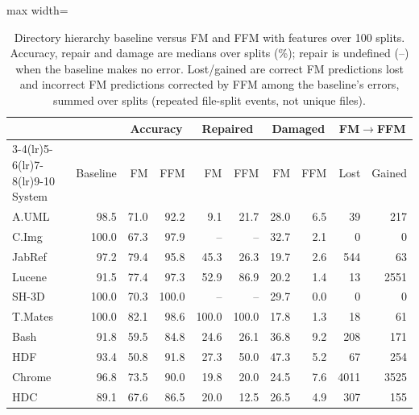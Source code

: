 \begin{table}[t]
\centering
\small
\caption{Directory hierarchy baseline versus FM and FFM with \ft{} features over 100 splits. Accuracy, repair and damage are medians over splits (\%); repair is undefined (--) when the baseline makes no error. Lost/gained are correct FM predictions lost and incorrect FM predictions corrected by FFM among the baseline's errors, summed over splits (repeated file-split events, not unique files).\label{tab:directory_baseline}}
\begin{adjustbox}{max width=\textwidth}
\begin{tabular}{lrrrrrrrrr}
\toprule
& & \multicolumn{2}{c}{Accuracy} & \multicolumn{2}{c}{Repaired} & \multicolumn{2}{c}{Damaged} & \multicolumn{2}{c}{FM$\to$FFM} \\
\cmidrule(lr){3-4}\cmidrule(lr){5-6}\cmidrule(lr){7-8}\cmidrule(lr){9-10}
System & Baseline & FM & FFM & FM & FFM & FM & FFM & Lost & Gained \\
\midrule
A.UML & 98.5 & 71.0 & 92.2 & 9.1 & 21.7 & 28.0 & 6.5 & 39 & 217 \\
C.Img & 100.0 & 67.3 & 97.9 & -- & -- & 32.7 & 2.1 & 0 & 0 \\
JabRef & 97.2 & 79.4 & 95.8 & 45.3 & 26.3 & 19.7 & 2.6 & 544 & 63 \\
Lucene & 91.5 & 77.4 & 97.3 & 52.9 & 86.9 & 20.2 & 1.4 & 13 & 2551 \\
SH-3D & 100.0 & 70.3 & 100.0 & -- & -- & 29.7 & 0.0 & 0 & 0 \\
T.Mates & 100.0 & 82.1 & 98.6 & 100.0 & 100.0 & 17.8 & 1.3 & 18 & 61 \\
Bash & 91.8 & 59.5 & 84.8 & 24.6 & 26.1 & 36.8 & 9.2 & 208 & 171 \\
HDF & 93.4 & 50.8 & 91.8 & 27.3 & 50.0 & 47.3 & 5.2 & 67 & 254 \\
Chrome & 96.8 & 73.5 & 90.0 & 19.8 & 20.0 & 24.5 & 7.6 & 4011 & 3525 \\
HDC & 89.1 & 67.6 & 86.5 & 20.0 & 12.5 & 26.5 & 4.9 & 307 & 155 \\
\bottomrule
\end{tabular}
\end{adjustbox}
\end{table}
